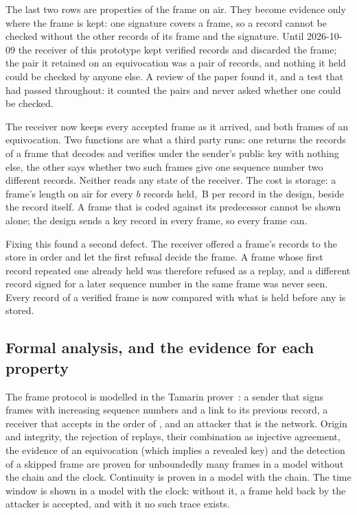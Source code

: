 \begin{remark}
The last two rows are properties of the frame on air. They become evidence only where the frame
is kept: one signature covers a frame, so a record cannot be checked without the other records
of its frame and the signature. Until 2026-10-09 the receiver of this prototype kept verified
records and discarded the frame; the pair it retained on an equivocation was a pair of records,
and nothing it held could be checked by anyone else. A review of the paper found it, and a test
that had passed throughout: it counted the pairs and never asked whether one could be checked.

The receiver now keeps every accepted frame as it arrived, and both frames of an equivocation.
Two functions are what a third party runs: one returns the records of a frame that decodes and
verifies under the sender's public key with nothing else, the other says whether two such
frames give one sequence number two different records. Neither reads any state of the receiver.
The cost is storage: a frame's length on air for every $b$ records held, \bprLeanDesign\,B per
record in the design, beside the record itself. A frame that is coded against its predecessor
cannot be shown alone; the design sends a key record in every frame, so every frame can.

Fixing this found a second defect. The receiver offered a frame's records to the store in order
and let the first refusal decide the frame. A frame whose first record repeated one already
held was therefore refused as a replay, and a different record signed for a later sequence
number in the same frame was never seen. Every record of a verified frame is now compared with
what is held before any is stored.
\end{remark}

\subsection{Formal analysis, and the evidence for each property}\label{sec:formal}

The frame protocol is modelled in the Tamarin prover~\cite{tamarin}: a sender that signs
frames with increasing sequence numbers and a link to its previous record, a receiver that
accepts in the order of , and an attacker that is the network. Origin and
integrity, the rejection of replays, their combination as injective agreement, the evidence of
an equivocation (which implies a revealed key) and the detection of a skipped frame are proven
for unboundedly many frames in a model without the chain and the clock. Continuity is proven in
a model with the chain. The time window is shown in a model with the clock: without it, a frame
held back by the attacker is accepted, and with it no such trace exists.


